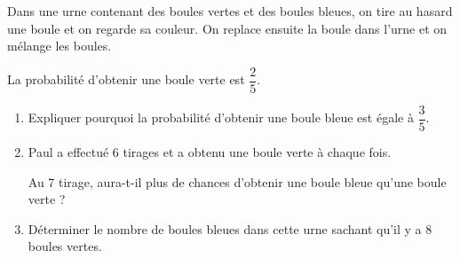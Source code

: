 
Dans une urne contenant des boules vertes et des boules bleues, on tire au hasard une boule et on regarde sa
couleur. On replace ensuite la boule dans l'urne et on mélange les boules.

La probabilité d'obtenir une boule verte est $\dfrac{2}{5}$.
\medskip

\begin{enumerate}
\item Expliquer pourquoi la probabilité d'obtenir une boule bleue est égale à $\dfrac{3}{5}$.
\item  Paul a effectué 6 tirages et a obtenu une boule verte à chaque fois.

Au 7 tirage, aura-t-il plus de chances d'obtenir une boule bleue qu'une boule verte ?
\item  Déterminer le nombre de boules bleues dans cette urne sachant qu'il y a 8 boules vertes.
\end{enumerate} 

